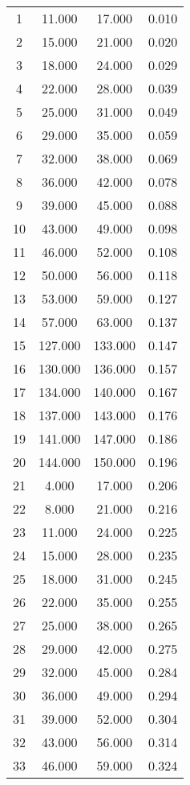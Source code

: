 % 
\begin{tabular}{cccc}
  \hline
  \hline
1 & 11.000 & 17.000 & 0.010 \\ 
  2 & 15.000 & 21.000 & 0.020 \\ 
  3 & 18.000 & 24.000 & 0.029 \\ 
  4 & 22.000 & 28.000 & 0.039 \\ 
  5 & 25.000 & 31.000 & 0.049 \\ 
  6 & 29.000 & 35.000 & 0.059 \\ 
  7 & 32.000 & 38.000 & 0.069 \\ 
  8 & 36.000 & 42.000 & 0.078 \\ 
  9 & 39.000 & 45.000 & 0.088 \\ 
  10 & 43.000 & 49.000 & 0.098 \\ 
  11 & 46.000 & 52.000 & 0.108 \\ 
  12 & 50.000 & 56.000 & 0.118 \\ 
  13 & 53.000 & 59.000 & 0.127 \\ 
  14 & 57.000 & 63.000 & 0.137 \\ 
  15 & 127.000 & 133.000 & 0.147 \\ 
  16 & 130.000 & 136.000 & 0.157 \\ 
  17 & 134.000 & 140.000 & 0.167 \\ 
  18 & 137.000 & 143.000 & 0.176 \\ 
  19 & 141.000 & 147.000 & 0.186 \\ 
  20 & 144.000 & 150.000 & 0.196 \\ 
  21 & 4.000 & 17.000 & 0.206 \\ 
  22 & 8.000 & 21.000 & 0.216 \\ 
  23 & 11.000 & 24.000 & 0.225 \\ 
  24 & 15.000 & 28.000 & 0.235 \\ 
  25 & 18.000 & 31.000 & 0.245 \\ 
  26 & 22.000 & 35.000 & 0.255 \\ 
  27 & 25.000 & 38.000 & 0.265 \\ 
  28 & 29.000 & 42.000 & 0.275 \\ 
  29 & 32.000 & 45.000 & 0.284 \\ 
  30 & 36.000 & 49.000 & 0.294 \\ 
  31 & 39.000 & 52.000 & 0.304 \\ 
  32 & 43.000 & 56.000 & 0.314 \\ 
  33 & 46.000 & 59.000 & 0.324 \\ 

\end{tabular}
